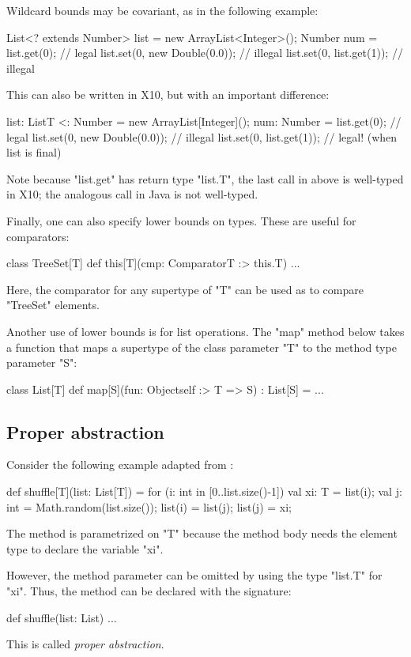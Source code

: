 \documentclass[preprint,nocopyrightspace,9pt]{sigplanconf}
\begin{document}
Wildcard bounds may be covariant, as in the following example:
\begin{xten}
List<? extends Number> list = new ArrayList<Integer>();
Number num = list.get(0);     // legal
list.set(0, new Double(0.0)); // illegal
list.set(0, list.get(1));     // illegal
\end{xten}
This can also be written in X10, but with an important
difference:
\begin{xten}
list: List{T <: Number} = new ArrayList[Integer]();
num: Number = list.get(0);    // legal
list.set(0, new Double(0.0)); // illegal
list.set(0, list.get(1));     // legal! (when list is final)
\end{xten}
Note because \xcd"list.get" has return type \xcd"list.T", the
last call in above is well-typed in X10; the analogous call in
Java is not well-typed.

Finally,
one can also specify lower bounds on types.  These are useful for
comparators:
\begin{xten}
class TreeSet[T] {
  def this[T](cmp: Comparator{T :> this.T}) { ... }
}
\end{xten}
Here, the comparator for any supertype of \xcd"T" can be used as
to compare \xcd"TreeSet" elements.

Another use of lower bounds is for list operations.
The \xcd"map" method below takes a function that maps a supertype
of the class parameter \xcd"T" to the method type parameter \xcd"S":
\begin{xten}
class List[T] {
  def map[S](fun: Object{self :> T} => S) : List[S] = { ... }
}
\end{xten}

\subsection{Proper abstraction}

Consider the following example adapted from \cite{adding-wildcards}:
\begin{xten}
def shuffle[T](list: List[T]) = {
  for (i: int in [0..list.size()-1]) {
    val xi: T = list(i);
    val j: int = Math.random(list.size());
    list(i) = list(j);
    list(j) = xi;
  }
}
\end{xten}
The method is parametrized on \xcd"T" because the method body needs
the element type to declare the variable \xcd"xi".

However, the method parameter can be omitted by using the type \xcd"list.T"
for \xcd"xi".  Thus, the method can be declared with the signature:
\begin{xten}
def shuffle(list: List) { ... }
\end{xten}
This is called \emph{proper abstraction}.
\end{document}
